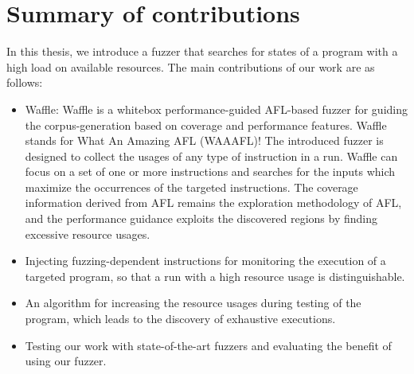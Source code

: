 \section{Summary of contributions}
\label{sec:1.2}

In this thesis, we introduce a fuzzer that searches for states of a program with a high load on available resources. The main contributions of our work are as follows:

\begin{itemize}
    \item Waffle: Waffle is a whitebox performance-guided AFL-based fuzzer for guiding the corpus-generation based on coverage and performance features. Waffle stands for What An Amazing AFL (WAAAFL)! The introduced fuzzer is designed to collect the usages of any type of instruction in a run. Waffle can focus on a set of one or more instructions and searches for the inputs which maximize the occurrences of the targeted instructions. The coverage information derived from AFL remains the exploration methodology of AFL, and the performance guidance exploits the discovered regions by finding excessive resource usages.
    \item Injecting fuzzing-dependent instructions for monitoring the execution of a targeted program, so that a run with a high resource usage is distinguishable.
    \item An algorithm for increasing the resource usages during testing of the program, which leads to the discovery of exhaustive executions.
    \item Testing our work with state-of-the-art fuzzers and evaluating the benefit of using our fuzzer. 
\end{itemize}